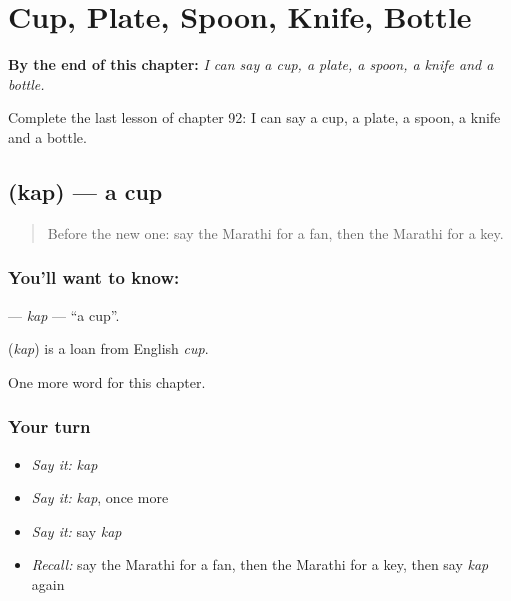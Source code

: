 
\chapter{Cup, Plate, Spoon, Knife, Bottle}
\label{ch:mr-cup-plate-spoon-knife-bottle}

\begin{chapteropening}
\textbf{By the end of this chapter:} \emph{I can say a cup, a plate, a spoon, a knife and a bottle.}

Complete the last lesson of chapter 92: I can say a cup, a plate, a spoon, a knife and a bottle.
\end{chapteropening}

\section[\texorpdfstring{\mr{कप} (kap)}{कप (kap)}]{ (kap) — a cup}

\label{lesson:MR-C92-kap}



\begin{quote}
Before the new one: say the Marathi for a fan, then the Marathi for a key.
\end{quote}

\subsection*{You'll want to know: }
\textbf{} — \emph{kap} — \textquotedblleft{}a cup\textquotedblright{}.

\begin{cousinweb}
\textbf{} (\emph{kap}) is a loan from English \emph{cup}.
\end{cousinweb}

\begin{grammarlens}[title={What you've built}]
One more word for this chapter.
\end{grammarlens}

\subsection*{Your turn}
\begin{itemize}
\raggedright
  \item \emph{Say it:} \emph{kap}
  \item \emph{Say it:} \emph{kap}, once more
  \item \emph{Say it:} say \emph{kap}
  \item \emph{Recall:} say the Marathi for a fan, then the Marathi for a key, then say \emph{kap} again
\end{itemize}

